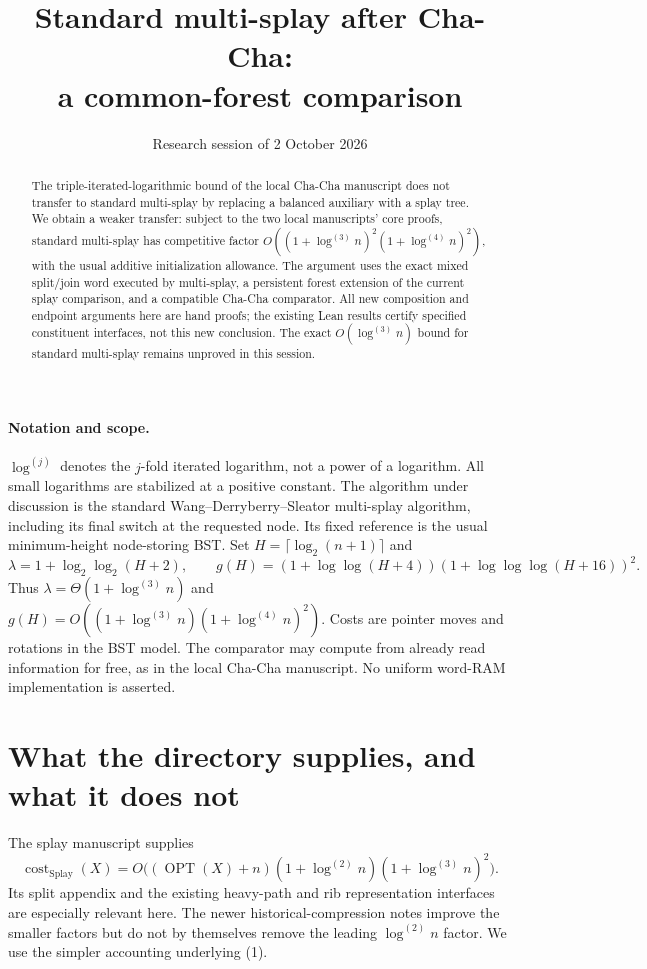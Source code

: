 \documentclass[11pt]{article}
\title{Standard multi-splay after Cha-Cha:\\a common-forest comparison}
\author{Research session of 2 October 2026}
\date{}
\newcommand{\OPT}{\operatorname{OPT}}
\newcommand{\cost}{\operatorname{cost}}
\newcommand{\Splay}{\operatorname{Splay}}
\newcommand{\lgit}[1]{\log^{(#1)}}
\begin{document}
\maketitle

\begin{abstract}
The triple-iterated-logarithmic bound of the local Cha-Cha
manuscript does not transfer to standard multi-splay by replacing a
balanced auxiliary with a splay tree. We obtain a weaker transfer:
subject to the two local manuscripts' core proofs, standard multi-splay
has competitive factor
$O((1+\lgit{3}n)^2(1+\lgit{4}n)^2)$, with the usual additive
initialization allowance. The argument uses the exact mixed split/join
word executed by multi-splay, a persistent forest extension of the
current splay comparison, and a compatible Cha-Cha comparator.
All new composition and endpoint arguments here are hand proofs;
the existing Lean results certify specified constituent interfaces,
not this new conclusion. The exact $O(\lgit{3}n)$ bound for standard
multi-splay remains unproved in this session.
\end{abstract}

\paragraph{Notation and scope.}
$\lgit{j}$ denotes the $j$-fold iterated logarithm, not a power of a
logarithm. All small logarithms are stabilized at a positive constant.
The algorithm under discussion is the standard Wang--Derryberry--Sleator
multi-splay algorithm, including its final switch at the requested node.
Its fixed reference is the usual minimum-height node-storing BST.
Set $H=\lceil\log_2(n+1)\rceil$ and
\[
 \lambda=1+\log_2\log_2(H+2),\qquad
 g(H)=(1+\log\log(H+4))(1+\log\log\log(H+16))^2.
\]
Thus $\lambda=\Theta(1+\lgit{3}n)$ and
$g(H)=O((1+\lgit{3}n)(1+\lgit{4}n)^2)$.
Costs are pointer moves and rotations in the BST model. The comparator
may compute from already read information for free, as in the local
Cha-Cha manuscript. No uniform word-RAM implementation is asserted.

\section{What the directory supplies, and what it does not}

The splay manuscript supplies
\[
 \cost_{\Splay}(X)=
 O\bigl((\OPT(X)+n)(1+\lgit{2}n)(1+\lgit{3}n)^2\bigr).
                                                        \tag{1}
\]
Its split appendix and the existing heavy-path and rib representation
interfaces are especially relevant here. The newer historical-compression
notes improve the smaller factors but do not by themselves remove the
leading $\lgit{2}n$ factor. We use the simpler accounting underlying (1).
\end{document}
